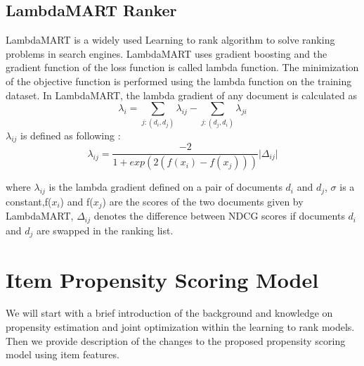 \documentclass[11pt]{article}
\begin{document}
\subsection{LambdaMART Ranker}

LambdaMART is a widely used Learning to rank algorithm to solve ranking problems in search engines. LambdaMART \cite{burges2010from, 10.1145/3077136.3080838, 10.1145/1273496.1273513} uses gradient boosting and the gradient function of the loss function is called lambda function. The minimization of the objective function is performed using the lambda function on the training dataset. In LambdaMART, the lambda gradient of any document is calculated as 
\begin{equation}
\lambda_{i} = \sum_{j:(d_i , d_j)}{}\lambda_{ij} - \sum_{j:(d_j , d_i)}\lambda_{ji}
\end{equation}
 $\lambda_{ij}$ is defined as following :
\[\lambda_{ij}=\frac{-2}{1+exp(2(f(x_i)-f(x_j)))}\big|\Delta_{ij}\big|\]

where $\lambda_{ij}$ is the lambda gradient defined on a pair of documents $d_i$ and $d_j$, $\sigma$ is a constant,f($x_i$) and f($x_j$) are the scores of the two documents given by LambdaMART, $\Delta_{ij}$ denotes the difference between NDCG scores if documents $d_i$ and $d_j$ are swapped in the ranking list.

\section{Item Propensity Scoring Model}
We will start with a brief introduction of the background and knowledge on propensity estimation and joint optimization within the learning to rank models. Then we provide description of the changes to the proposed propensity scoring model using item features.
\end{document}
